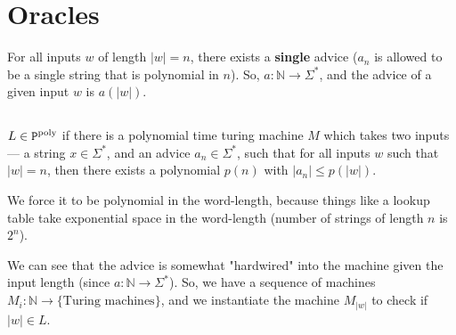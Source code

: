\section{Oracles}

For all inputs $w$ of length $|w| = n$, there exists a \textbf{single} advice
($a_n$ is allowed to be a single string that is polynomial in $n$).
So, $a: \mathbb{N} \to \Sigma^*$, and the advice of a given input $w$ is $a(|w|)$.


\subsection{\ppoly}

$L \in \text{$\texttt{P}^{\text{poly}}$}$ if there is a polynomial time turing machine $M$ which
takes two inputs --- a string $x \in \Sigma^*$, and an advice $a_n \in \Sigma^*$,
such that for all inputs $w$ such that $|w| = n$, then there exists a polynomial
$p(n)$ with $|a_n| \leq p(|w|)$.

We force it to be polynomial in the word-length, because things like a lookup
table take exponential space in the word-length (number of strings of length $n$
is $2^n$).

We can see that the advice is somewhat "hardwired" into the machine given
the input length (since $a: \mathbb{N} \to \Sigma^*$). So, we have a 
sequence of machines $M_i: \mathbb{N} \to \{ \text{Turing machines} \}$, and we instantiate
the machine $M_{|w|}$ to check if $|w| \in L$.


